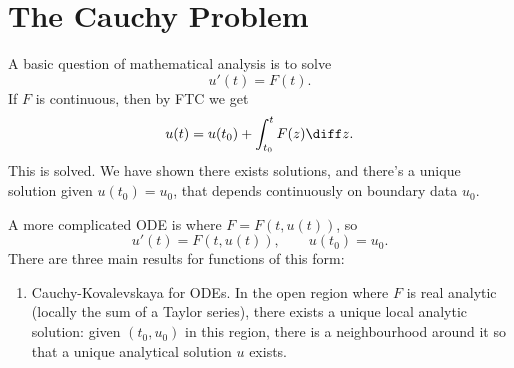 \documentclass[12pt]{article}
\begin{document}
\begin{center}
\end{center}

\newpage

\section{The Cauchy Problem}%
\label{sec:cauchy}

A basic question of mathematical analysis is to solve
\[
u'(t) = F(t).
\]
If $F$ is continuous, then by FTC we get
\[
u(t) = u(t_0) + \int_{t_0}^t F(z) \diff z.
\]
This is solved. We have shown there exists solutions, and there's a unique solution given $u(t_0) = u_0$, that depends continuously on boundary data $u_0$.

A more complicated ODE is where $F = F(t, u(t))$, so
\[
u'(t) = F(t, u(t)), \qquad u(t_0) = u_0.
\]
There are three main results for functions of this form:
\begin{enumerate}[Result 1.]
	\item Cauchy-Kovalevskaya for ODEs. In the open region where $F$ is real analytic (locally the sum of a Taylor series), there exists a unique local analytic solution: given $(t_0, u_0)$ in this region, there is a neighbourhood around it so that a unique analytical solution $u$ exists.
\end{enumerate}
\end{document}
